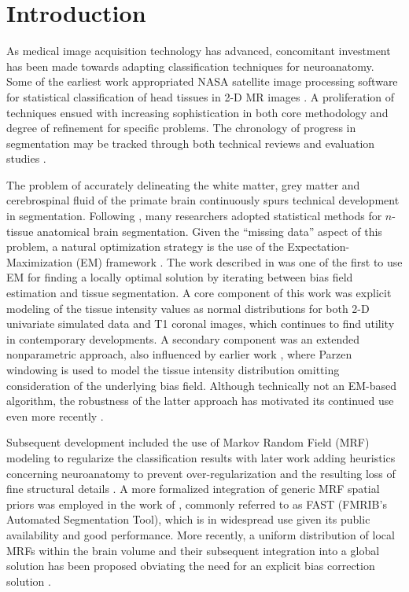 \documentclass[11pt,english]{article}
\begin{document}
\clearpage

\section{Introduction} As medical image acquisition technology has advanced,
concomitant investment has been made towards adapting classification
techniques for neuroanatomy.  Some of the earliest work appropriated NASA
satellite image processing software for statistical classification of
head tissues in 2-D MR images \citep{Vannier1985}.  A proliferation of
techniques ensued with increasing sophistication in both core
methodology and degree of refinement for specific problems.  The
chronology of progress in segmentation may be tracked through both
technical reviews
\citep{Bezdek1993,Pal1993,Clarke1995,Pham2000,Viergever2001,Suri2002,Duncan2004,Balafar2010}
and evaluation studies
\citep[e.g.][]{Cuadra2005,Zaidi2006,Klauschen2009,Boer2010}.

The problem of accurately delineating the white matter, grey matter
and cerebrospinal fluid of the primate brain continuously spurs
technical development in segmentation.  Following \cite{Vannier1985},
many researchers adopted statistical methods for $n$-tissue anatomical
brain segmentation.  Given the ``missing data'' aspect of this
problem, a natural optimization strategy is the use of the
Expectation-Maximization (EM) framework \citep{Dempster1977}.  The
work described in \cite{Wells1996} was one of the first to use EM for
finding a locally optimal solution by iterating between bias field
estimation and tissue segmentation.  A core component of this work was
explicit modeling of the tissue intensity values as normal
distributions \citep{Cline1990} for both 2-D univariate simulated data
and T1 coronal images, which continues to find utility in contemporary
developments.  A secondary component was an extended nonparametric
approach, also influenced by earlier work \citep{Kikinis1992}, where
Parzen windowing is used to model the tissue intensity distribution
omitting consideration of the underlying bias field.  Although
technically not an EM-based algorithm, the robustness of the latter
approach has motivated its continued use even more recently \citep[e.g.][]{Weisenfeld2009}.

Subsequent development included the use of Markov Random Field (MRF)  modeling \citep{Geman1984}
to regularize the classification results \citep{Held1997} with later work adding heuristics concerning neuroanatomy to prevent 
over-regularization and the resulting loss of fine structural details \citep{Leemput1999,Leemput1999a}.  
A more formalized integration of generic MRF spatial priors was employed in the work of \cite{Zhang2001}, 
commonly referred to as FAST (FMRIB's Automated Segmentation Tool), which is in widespread use
given its public availability and good performance.  More recently, a uniform distribution of local MRFs within the brain volume and their subsequent integration into a global solution has been proposed obviating the need for an 
explicit bias correction solution \citep{Scherrer2009}.  
\end{document}
